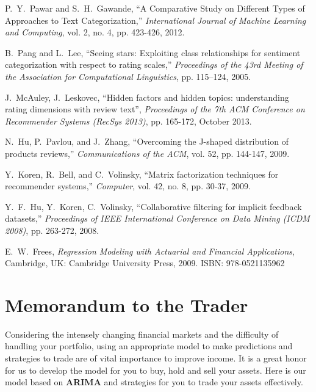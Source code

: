 \documentclass[12pt,a4paper]{article}
\newcommand{\Predictor}{ARIMA }
\begin{document}
\begin{spacing}{1.2}
\newpage
\begin{thebibliography}{00}


P.~Y.~Pawar and S.~H.~Gawande, ``A Comparative Study on Different Types of Approaches to Text Categorization,'' \textit{International Journal of Machine Learning and Computing}, vol. 2, no. 4, pp. 423-426, 2012.

B.~Pang and L.~Lee, ``Seeing stars: Exploiting class relationships for sentiment categorization with respect to rating scales,'' \textit{Proceedings of the 43rd Meeting of the Association for Computational Linguistics}, pp. 115–124, 2005.

J.~McAuley, J.~Leskovec, ``Hidden factors and hidden topics: understanding rating dimensions with review text'', \textit{Proceedings of the 7th ACM Conference on Recommender Systems (RecSys 2013)}, pp. 165-172, October 2013.

N.~Hu, P.~Pavlou, and J.~Zhang, ``Overcoming the J-shaped distribution of products reviews,'' \textit{Communications of the ACM}, vol. 52, pp. 144-147, 2009. 

Y.~Koren, R.~Bell, and C.~Volinsky, ``Matrix factorization techniques for recommender systems,'' \textit{Computer}, vol. 42, no. 8, pp. 30-37, 2009.

Y.~F.~Hu, Y.~Koren, C.~Volinsky, ``Collaborative filtering for implicit feedback datasets,'' \textit{Proceedings of IEEE International Conference on Data Mining (ICDM 2008)}, pp. 263-272, 2008.

E.~W.~Frees, \textit{Regression Modeling with Actuarial and Financial Applications}, Cambridge, UK: Cambridge University Press, 2009. ISBN: 978-0521135962

\end{thebibliography}


\addtocounter{page}{-1}
\thispagestyle{empty}

\newpage
\addtocounter{page}{-1}
\thispagestyle{empty}

{\centering\section*{Memorandum to the Trader}}

Considering the intensely changing financial markets and the difficulty of handling your portfolio, using an appropriate model to make predictions and strategies to trade are of vital importance to improve income. It is a great honor for us to develop the model for you to buy, hold and sell your assets. Here is our model based on \textbf{\Predictor} and strategies for you to trade your assets effectively.  


\end{spacing}
\end{document}
